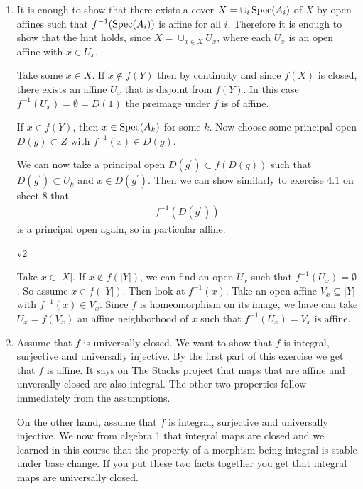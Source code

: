 \begin{exercise}{2}
    \begin{enumerate}
        \item{It is enough to show that there exists a cover $X=\cup_i \operatorname{Spec}(A_i)$ of $X$ by open affines 
        such that $f^{-1}(\operatorname{Spec}(A_i))$ is affine for all $i$. Therefore it is enough to show that the hint holds,
        since $X=\cup_{x\in X} U_x$, where each $U_x$ is an open affine with $x\in U_x$.

        Take some $x\in X$. If $x \not \in f(Y)$ then by continuity and since $f(X)$ is closed, 
        there exists an affine $U_x$ that is disjoint from $f(Y)$. In this case $f^{-1}(U_x)=\emptyset=D(1)$ the preimage under 
        $f$ is of affine.
        
        If $x\in f(Y)$, then $x\in \operatorname{Spec}(A_k)$ for some $k$. 
        Now choose some principal open $D(g)\subset Z$ with $f^{-1}(x)\in D(g)$. 

        We can now take a principal open $D(g^\prime) \subset f(D(g))$ such that $D(g^\prime) \subset U_k$ and $x\in D(g^\prime)$.
        Then we can show similarly to exercise 4.1 on sheet 8 that 
        \begin{align*}
            f^{-1}(D(g^\prime))
        \end{align*}
        is a principal open again, so in particular affine.
                

        v2

        Take $x \in |X|$. If $x \notin f(|Y|)$, we can find an open $U_x$ such
        that $f^{-1} (U_x) = \emptyset$. So assume $x \in f(|Y|)$. Then look
        at $f^{-1}(x)$. Take an open affine $V_x \subseteq |Y|$ with $f^{-1}
        (x) \in V_x$. Since $f$ is homeomorphism on its image, we have can
        take $U_x = f(V_x)$ an affine neighborhood of $x$ such that
        $f^{-1}(U_x) = V_x$ is affine.
        }
        \item{Assume that $f$ is universally closed. We want to show that $f$ is
            integral, surjective and universally injective. By the first part of
            this exercise we get that $f$ is affine. It says on
            \href{https://stacks.math.columbia.edu/tag/01WM}{The Stacks project}
            that maps that are affine and unversally closed are also integral.
            The other two properties follow immediately from the assumptions.

            On the other hand, assume that $f$ is integral, surjective and
            universally injective. We now from algebra 1 that integral maps are
            closed and we learned in this course that the property of a morphism
            being integral is stable under base change. If you put these two
            facts together you get that integral maps are universally closed.

}
\end{enumerate}
\end{exercise}
